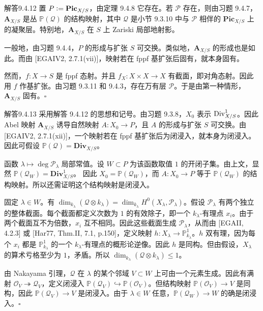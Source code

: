 \begin{origstatement}{解答}{9.4.12}\label{appA:ans9412}
置 $P\mathrel{\mathop:}=\mathbf{Pic}_{X/S}$，由定理 9.4.8 它存在。若 $\mathcal P$ 存在，则由习题 9.4.7，$\mathbf A_{X/S}$ 是丛 $\mathbb P(\mathcal Q)$ 的结构映射，其中 $\mathcal Q$ 是小节 9.3.10 中与 $\mathcal P$ 相伴的 $\mathbf{Pic}_{X/S}$ 上的凝聚层。特别地，$\mathbf A_{X/S}$ 在 $S$ 上 Zariski 局部地射影。

一般地，由习题 9.4.4，$P$ 的形成与扩张 $S$ 可交换。类似地，$\mathbf A_{X/S}$ 的形成也是如此。而由 [EGAIV2, 2.7.1(vii)]，映射若在 fppf 基扩张后固有，就本身固有。

然而，$f\colon X\to S$ 是 fppf 态射。并且 $f_X\colon X\times X\to X$ 有截面，即对角态射。因此用 $f$ 作基扩张。由习题 9.3.11 和 9.4.3，存在万有层 $\mathcal P$。于是由第一种情形，$\mathbf A_{X/S}$ 固有。\hfill$\square$
\end{origstatement}

\begin{origstatement}{解答}{9.4.13}\label{appA:ans9413}
采用解答 9.4.12 的思想和记号。由习题 9.3.8，$X_0$ 表示 $\operatorname{Div}_{X/S}^1$。因此 Abel 映射 $\mathbf A_{X/S}$ 诱导自然映射 $A\colon X_0\to P$，且 $A$ 的形成与扩张 $S$ 可交换。由 [EGAIV2, 2.7.1(xii)]，一个映射若在 fppf 基扩张后为闭浸入，就本身为闭浸入。因此可假设 $\mathbb P(\mathcal Q)=\mathbf{Div}_{X/S}$。

函数 $\lambda\mapsto\deg\mathcal P_\lambda$ 局部常值。设 $W\subset P$ 为该函数取值 $1$ 的开闭子集。由上文，显然 $\mathbb P(\mathcal Q_W)=\mathbf{Div}_{X/S}^1$。
因此 $X_0=\mathbb P(\mathcal Q_W)$，而 $A\colon X_0\to P$ 等于 $\mathbb P(\mathcal Q_W)$ 的结构映射。所以还需证明这个结构映射是闭浸入。

固定 $\lambda\in W$。有 $\dim_{k_\lambda}(\mathcal Q\otimes k_\lambda)=\dim_{k_\lambda}H^0(X_\lambda,\mathcal P_\lambda)$。假设 $\mathcal P_\lambda$ 有两个独立的整体截面。每个截面都定义次数为 $1$ 的有效除子，即一个 $k_\lambda$-有理点 $x_i$。由于两个截面互不为倍数，$x_i$ 互不相同。因此这些截面生成 $\mathcal P_\lambda$，从而由 [EGAII, 4.2.3] 或 [Har77, Thm.II, 7.1, p.150]，定义映射 $h\colon X_\lambda\to\mathbb P_{k_\lambda}^1$。$h$ 双有理，因为每个 $x_i$ 都是 $\mathbb P_{k_\lambda}^1$ 的一个 $k_\lambda$-有理点的概形论逆像。因此 $h$ 是同构。但由假设，$X_\lambda$ 的算术亏格至少为 $1$，矛盾。所以 $\dim_{k_\lambda}(\mathcal Q\otimes k_\lambda)\leq1$。

由 Nakayama 引理，$\mathcal Q$ 在 $\lambda$ 的某个邻域 $V\subset W$ 上可由一个元素生成。因此有满射 $\mathcal O_V\twoheadrightarrow\mathcal Q_V$，定义闭浸入 $\mathbb P(\mathcal Q_V)\hookrightarrow\mathbb P(\mathcal O_V)$。但结构映射 $\mathbb P(\mathcal O_V)\to V$ 是同构，因此 $\mathbb P(\mathcal Q_V)\to V$ 是闭浸入。由于 $\lambda\in W$ 任意，$\mathbb P(\mathcal Q_W)\to W$ 的确是闭浸入。\hfill$\square$
\end{origstatement}


